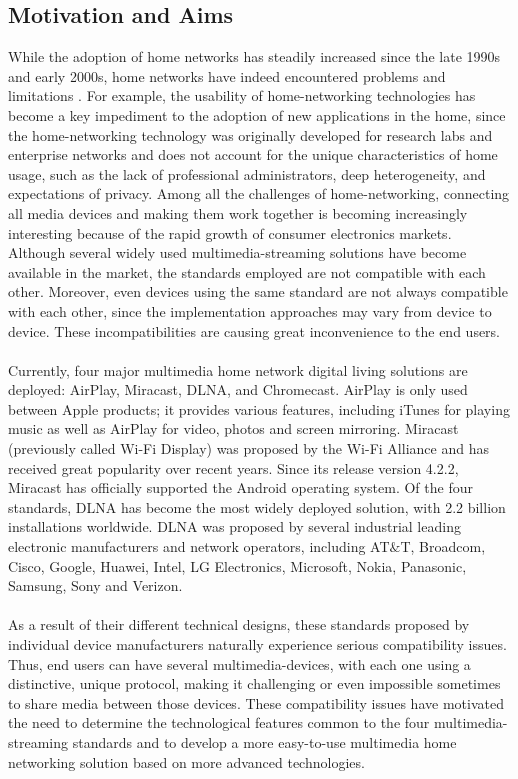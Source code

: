 \subsection{Motivation and Aims}
While the adoption of home networks has steadily increased since the late 1990s
and early 2000s, home networks have indeed encountered problems and limitations
\cite{stateofHN}. For example, the usability of home-networking technologies has
become a key impediment to the adoption of new applications in the home, since the
home-networking technology was originally developed for research labs and
enterprise networks and does not account for the unique characteristics of home
usage, such as the lack of professional administrators, deep heterogeneity, and
expectations of privacy. Among all the challenges of home-networking,
connecting all media devices and making them work together is becoming
increasingly interesting because of the rapid growth of consumer electronics
markets. Although several widely used multimedia-streaming solutions have
become available in the market, the standards employed are not compatible with
each other. Moreover, even devices using the same standard are not always
compatible with each other, since the implementation approaches may vary from
device to device. These incompatibilities are causing great inconvenience to
the end users.\\
\\
Currently, four major multimedia home network digital living solutions  are
deployed: AirPlay, Miracast, DLNA, and Chromecast. AirPlay is only used
between Apple products; it provides various features, including iTunes for
playing music as well as AirPlay for video, photos and screen mirroring.
Miracast (previously called Wi-Fi Display) was proposed by the Wi-Fi Alliance
and has received great popularity over recent years. Since its release version
4.2.2, Miracast has officially supported the Android operating system. Of the
four standards, DLNA has become the most widely deployed solution, with 2.2
billion installations worldwide. DLNA was proposed by several industrial
leading electronic manufacturers and network operators, including AT$\&$T,
Broadcom, Cisco, Google, Huawei, Intel, LG Electronics, Microsoft, Nokia,
Panasonic, Samsung, Sony and Verizon.\\
\\
As a result of their different technical designs, these standards proposed by
individual device manufacturers naturally experience serious compatibility
issues. Thus, end users can have several multimedia-devices, with each one
using a distinctive, unique protocol, making it challenging or even impossible
sometimes to share media between those devices. These compatibility issues have
motivated the need to determine the technological features common to the four
multimedia-streaming standards and to develop a more easy-to-use multimedia
home networking solution based on more advanced technologies.


